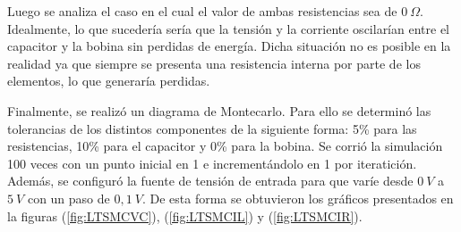 \documentclass[a4paper]{article}
\begin{document}
%
%
%
%
%
%

Luego se analiza el caso en el cual el valor de ambas resistencias sea de $0 \ \Omega$. Idealmente, lo que sucedería sería que la tensión y la corriente oscilarían entre el capacitor y la bobina sin perdidas de energía. Dicha situación no es posible en la realidad ya que siempre se presenta una resistencia interna por parte de los elementos, lo que generaría perdidas. 

Finalmente, se realizó un diagrama de Montecarlo. Para ello se determinó las tolerancias de los distintos componentes de la siguiente forma: 5\% para las resistencias, 10\% para el capacitor y 0\% para la bobina. Se corrió la simulación 100 veces con un punto inicial en 1 e incrementándolo en 1 por iteratición. Además, se configuró la fuente de tensión de entrada para que varíe desde $0 \ V$ a $5 \ V$ con un paso de $0,1 \ V$. De esta forma se obtuvieron los gráficos presentados en la figuras (\ref{fig:LTSMCVC}), (\ref{fig:LTSMCIL}) y (\ref{fig:LTSMCIR}).
\end{document}
